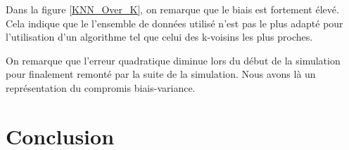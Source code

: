 \documentclass[a4paper]{article}
\begin{document}
Dans la figure \ref{KNN_Over_K}, on remarque que le biais est fortement élevé. Cela indique que le l'ensemble de données utilisé n'est pas le plus adapté pour l'utilisation d'un algorithme tel que celui des k-voisins les plus proches. \newline

On remarque que l'erreur quadratique diminue lors du début de la simulation pour finalement remonté par la suite de la simulation. Nous avons là un représentation du compromis biais-variance. \newline


\newpage

\section{Conclusion}

\newpage
\end{document}
